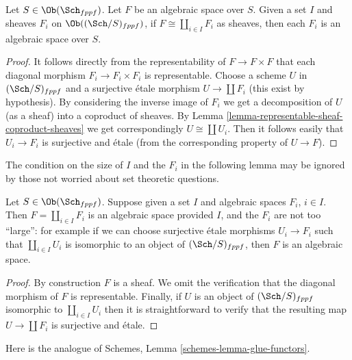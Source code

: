 \begin{lemma}
\label{lemma-algebraic-space-coproduct-sheaves}
Let $S \in \Ob(\Sch_{fppf})$.
Let $F$ be an algebraic space over $S$.
Given a set $I$ and sheaves $F_i$ on
$\Ob((\Sch/S)_{fppf})$,
if $F \cong \coprod_{i\in I} F_i$ as sheaves,
then each $F_i$ is an algebraic space over $S$.
\end{lemma}

\begin{proof}
It follows directly from the representability of
$F \to F \times F$ that each diagonal morphism
$F_i \to F_i \times F_i$ is representable.
Choose a scheme $U$ in $(\Sch/S)_{fppf}$ and a surjective
\'etale morphism $U \to \coprod F_i$ (this exist by hypothesis).
By considering the inverse image of $F_i$ we get a decomposition
of $U$ (as a sheaf) into a coproduct of sheaves.
By Lemma \ref{lemma-representable-sheaf-coproduct-sheaves}
we get correspondingly $U \cong \coprod U_i$.
Then it follows easily that $U_i \to F_i$ is surjective
and \'etale (from the corresponding property of $U \to F$).
\end{proof}

\noindent
The condition on the size of $I$ and the $F_i$ in the
following lemma may be ignored by those not worried about
set theoretic questions.

\begin{lemma}
\label{lemma-coproduct-algebraic-spaces}
Let $S \in \Ob(\Sch_{fppf})$.
Suppose given a set $I$ and algebraic spaces $F_i$, $i \in I$.
Then $F = \coprod_{i \in I} F_i$ is an algebraic space
provided $I$, and the $F_i$ are not too ``large'': for example if we
can choose surjective \'etale morphisms $U_i \to F_i$ such that
$\coprod_{i \in I} U_i$ is isomorphic to an object of
$(\Sch/S)_{fppf}$, then $F$ is an algebraic space.
\end{lemma}

\begin{proof}
By construction $F$ is a sheaf. We omit the verification that the
diagonal morphism of $F$ is representable. Finally, if $U$ is an
object of $(\Sch/S)_{fppf}$ isomorphic to $\coprod_{i \in I} U_i$
then it is straightforward to verify that the resulting map
$U \to \coprod F_i$ is surjective and \'etale.
\end{proof}

\noindent
Here is the analogue of Schemes, Lemma \ref{schemes-lemma-glue-functors}.

